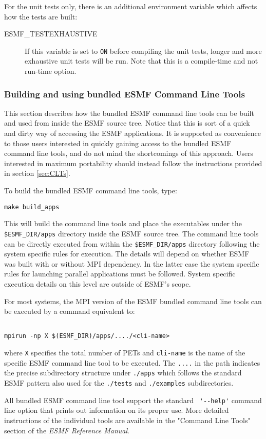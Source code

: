 For the unit tests only, there is an additional environment variable
which affects how the tests are built:
\begin{description}
\item[ESMF\_TESTEXHAUSTIVE]
If this variable is set to {\tt ON} before compiling the unit tests,
longer and more exhaustive unit tests will be run.  Note that this is a
compile-time and not run-time option.
\end{description}


\subsubsection{Building and using bundled ESMF Command Line Tools}
\label{quickapps}

This section describes how the bundled ESMF command line tools can be built
and used from inside the ESMF source tree. Notice that this is sort of a quick
and dirty way of accessing the ESMF applications. It is supported as
convenience to those users interested in quickly gaining access to the bundled
ESMF command line tools, and do not mind the shortcomings of this approach.
Users interested in maximum portability should instead follow the instructions
provided in section \ref{sec:CLTs}.

To build the bundled ESMF command line tools, type:
\begin{verbatim}
make build_apps
\end{verbatim}
This will build the command line tools and place the executables under the 
{\tt \$ESMF\_DIR/apps} directory inside the ESMF source tree. The 
command line tools can be directly executed from within the
{\tt \$ESMF\_DIR/apps} directory following the system specific rules for
execution. The details will depend on whether ESMF was built with or without
MPI dependency. In the latter case the system specific rules for launching
parallel applications must be followed. System specific execution details on
this level are outside of ESMF's scope.

For most systems, the MPI version of the ESMF bundled command line tools can be 
executed by a command equivalent to:

\begin{verbatim}

mpirun -np X $(ESMF_DIR)/apps/..../<cli-name>

\end{verbatim}
 
where {\tt X} specifies the total number of PETs and {\tt cli-name} is the 
name of the specific ESMF command line tool to be executed. The {\tt ....} in
the path indicates the precise subdirectory structure under {\tt ./apps} which
follows the standard ESMF pattern also used for the {\tt ./tests} and
{\tt ./examples} subdirectories.

All bundled ESMF command line tool support the standard \verb+ '--help'+ command
line option that prints out information on its proper use. More detailed
instructions of the individual tools are available in the "Command Line Tools"
section of the {\it ESMF Reference Manual}.

